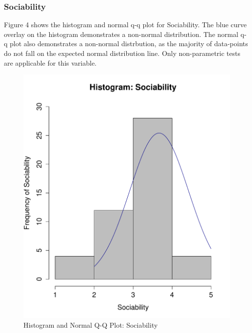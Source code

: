 \subsubsection{Sociability}

Figure 4 shows the histogram and normal q-q plot for Sociability. The blue curve overlay on the histogram demonstrates a non-normal distribution. The normal q-q plot also demonstrates a non-normal distrbution, as the majority of data-points do not fall on the expected normal distribution line. Only non-parametric tests are applicable for this variable.

\begin{figure}[H]
\caption{Histogram and Normal Q-Q Plot: Sociability}
\centering
\includegraphics[scale=0.35]{./img/hist_sociability.pdf}

\end{figure}
